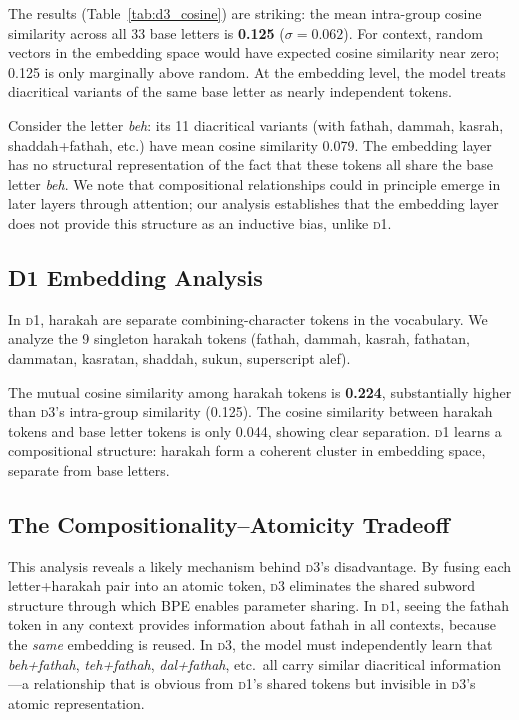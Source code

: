 \documentclass[11pt]{article}
\newcommand{\dOne}{\textsc{d1}}
\newcommand{\dThree}{\textsc{d3}}
\begin{document}
The results (Table~\ref{tab:d3_cosine}) are striking: the mean intra-group cosine similarity across all 33 base letters is \textbf{0.125} ($\sigma = 0.062$).
For context, random vectors in the embedding space would have expected cosine similarity near zero; 0.125 is only marginally above random.
At the embedding level, the model treats diacritical variants of the same base letter as nearly independent tokens.

Consider the letter \emph{beh}: its 11 diacritical variants (with fathah, dammah, kasrah, shaddah+fathah, etc.) have mean cosine similarity 0.079.
The embedding layer has no structural representation of the fact that these tokens all share the base letter \emph{beh}.
We note that compositional relationships could in principle emerge in later layers through attention; our analysis establishes that the embedding layer does not provide this structure as an inductive bias, unlike \dOne{}.

\subsection{D1 Embedding Analysis}

In \dOne{}, harakah are separate combining-character tokens in the vocabulary.
We analyze the 9 singleton harakah tokens (fathah, dammah, kasrah, fathatan, dammatan, kasratan, shaddah, sukun, superscript alef).

The mutual cosine similarity among harakah tokens is \textbf{0.224}, substantially higher than \dThree{}'s intra-group similarity (0.125).
The cosine similarity between harakah tokens and base letter tokens is only 0.044, showing clear separation.
\dOne{} learns a compositional structure: harakah form a coherent cluster in embedding space, separate from base letters.

\subsection{The Compositionality--Atomicity Tradeoff}

This analysis reveals a likely mechanism behind \dThree{}'s disadvantage.
By fusing each letter+harakah pair into an atomic token, \dThree{} eliminates the shared subword structure through which BPE enables parameter sharing.
In \dOne{}, seeing the fathah token in any context provides information about fathah in all contexts, because the \emph{same} embedding is reused.
In \dThree{}, the model must independently learn that \emph{beh+fathah}, \emph{teh+fathah}, \emph{dal+fathah}, etc.\ all carry similar diacritical information---a relationship that is obvious from \dOne{}'s shared tokens but invisible in \dThree{}'s atomic representation.
\end{document}
